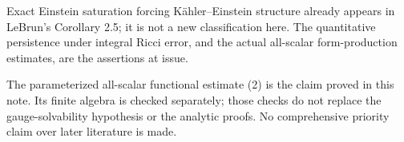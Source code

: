 \documentclass[
  11pt,
]{article}
\begin{document}
Exact Einstein saturation forcing Kähler--Einstein structure already
appears in LeBrun's Corollary 2.5; it is not a new classification here.
The quantitative persistence under integral Ricci error, and the actual
all-scalar form-production estimates, are the assertions at issue.

The parameterized all-scalar functional estimate (2) is the claim proved
in this note. Its finite algebra is checked separately; those checks do
not replace the gauge-solvability hypothesis or the analytic proofs. No
comprehensive priority claim over later literature is made.
\end{document}
